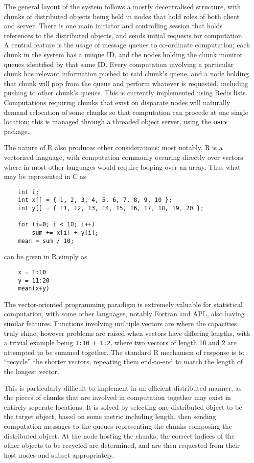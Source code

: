 \documentclass[a4paper,10pt]{article}
\begin{document}
The general layout of the system follows a mostly decentralised structure, with
chunks of distributed objects being held in nodes that hold roles of both
client and server.
There is one main initiator and controlling session that holds references to
the distributed objects, and sends initial requests for computation.
A central feature is the usage of message queues to co-ordinate computation;
each chunk in the system has a unique ID, and the nodes holding the chunk
monitor queues identified by that same ID.
Every computation involving a particular chunk has relevant information pushed
to said chunk's queue, and a node holding that chunk will pop from the queue
and perform whatever is requested, including pushing to other chunk's queues.
This is currently implemented using Redis lists.
Computations requiring chunks that exist on disparate nodes will naturally
demand relocation of some chunks so that computation can procede at one single
location; this is managed through a threaded object server, using the
\textbf{osrv} package\cite{urbanek2020osrv}.

The nature of R also produces other considerations; most notably, R is a
vectorised language, with computation commonly occuring directly over vectors
where in most other languages would require looping over an array.
Thus what may be represented in C as 
\begin{verbatim}
	int i;
	int x[] = { 1, 2, 3, 4, 5, 6, 7, 8, 9, 10 };
	int y[] = { 11, 12, 13, 14, 15, 16, 17, 18, 19, 20 };

	for (i=0; i < 10; i++)
		sum += x[i] + y[i]; 
	mean = sum / 10;
\end{verbatim}
can be given in R simply as
\begin{verbatim}
	x = 1:10
	y = 11:20
	mean(x+y)
\end{verbatim}
The vector-oriented programming paradigm is extremely valuable for statistical
computation, with some other languages, notably Fortran and APL, also having
similar features.
Functions involving multiple vectors are where the capacities truly shine,
however problems are raised when vectors have differing lengths, with a trivial
example being \texttt{1:10 + 1:2}, where two vectors of length 10 and 2
are attempted to be summed together.
The standard R mechanism of response is to ``recycle'' the shorter vectors,
repeating them end-to-end to match the length of the longest vector.

This is particularly difficult to implement in an efficient distributed manner,
as the pieces of chunks that are involved in computation together may exist in
entirely seperate locations.
It is solved by selecting one distributed object to be the target object, based
on some metric including length, then sending computation messages to the
queues representing the chunks composing the distributed object.
At the node hosting the chunks, the correct indices of the other objects to be
recycled are determined, and are then requested from their host nodes and
subset appropriately.
\end{document}
